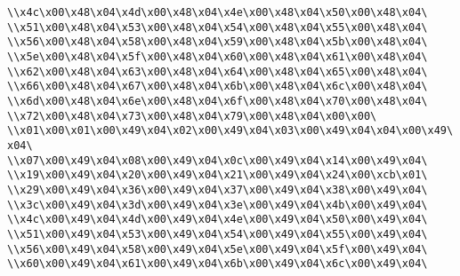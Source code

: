 \verb|\\x4c\x00\x48\x04\x4d\x00\x48\x04\x4e\x00\x48\x04\x50\x00\x48\x04\|\newline
\verb|\\x51\x00\x48\x04\x53\x00\x48\x04\x54\x00\x48\x04\x55\x00\x48\x04\|\newline
\verb|\\x56\x00\x48\x04\x58\x00\x48\x04\x59\x00\x48\x04\x5b\x00\x48\x04\|\newline
\verb|\\x5e\x00\x48\x04\x5f\x00\x48\x04\x60\x00\x48\x04\x61\x00\x48\x04\|\newline
\verb|\\x62\x00\x48\x04\x63\x00\x48\x04\x64\x00\x48\x04\x65\x00\x48\x04\|\newline
\verb|\\x66\x00\x48\x04\x67\x00\x48\x04\x6b\x00\x48\x04\x6c\x00\x48\x04\|\newline
\verb|\\x6d\x00\x48\x04\x6e\x00\x48\x04\x6f\x00\x48\x04\x70\x00\x48\x04\|\newline
\verb|\\x72\x00\x48\x04\x73\x00\x48\x04\x79\x00\x48\x04\x00\x00\|\newline
\verb|\\x01\x00\x01\x00\x49\x04\x02\x00\x49\x04\x03\x00\x49\x04\x04\x00\x49\x04\|\newline
\verb|\\x07\x00\x49\x04\x08\x00\x49\x04\x0c\x00\x49\x04\x14\x00\x49\x04\|\newline
\verb|\\x19\x00\x49\x04\x20\x00\x49\x04\x21\x00\x49\x04\x24\x00\xcb\x01\|\newline
\verb|\\x29\x00\x49\x04\x36\x00\x49\x04\x37\x00\x49\x04\x38\x00\x49\x04\|\newline
\verb|\\x3c\x00\x49\x04\x3d\x00\x49\x04\x3e\x00\x49\x04\x4b\x00\x49\x04\|\newline
\verb|\\x4c\x00\x49\x04\x4d\x00\x49\x04\x4e\x00\x49\x04\x50\x00\x49\x04\|\newline
\verb|\\x51\x00\x49\x04\x53\x00\x49\x04\x54\x00\x49\x04\x55\x00\x49\x04\|\newline
\verb|\\x56\x00\x49\x04\x58\x00\x49\x04\x5e\x00\x49\x04\x5f\x00\x49\x04\|\newline
\verb|\\x60\x00\x49\x04\x61\x00\x49\x04\x6b\x00\x49\x04\x6c\x00\x49\x04\|\newline
